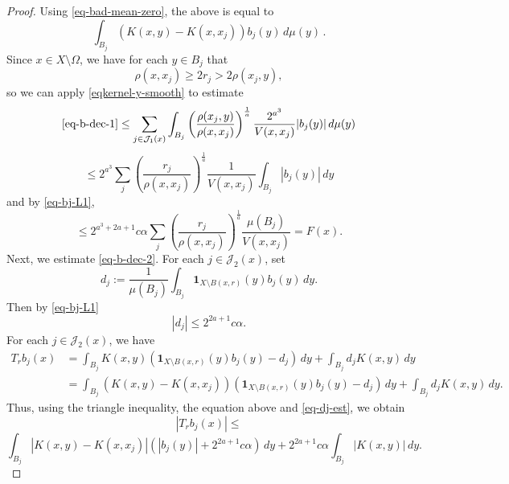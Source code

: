 \begin{proof}
Using \eqref{eq-bad-mean-zero}, the above is equal to
\begin{equation*}
    \int_{B_j} (K(x,y)-K(x,x_j)) b_j(y)\,d\mu(y)\,.
\end{equation*}
Since $x\in X\setminus\Omega$, we have for each $y\in B_j$ that
\begin{equation}
    \label{eq-Om-cj}
    \rho(x,x_j)\ge 2r_j > 2\rho(x_j,y),
\end{equation}
so we can apply \eqref{eqkernel-y-smooth} to estimate
\begin{equation*}
    \eqref{eq-b-dec-1} \le \sum_{j\in \mathcal{J}_1(x)}\int_{B_j}\left(\frac{\rho(x_j,y)}{\rho(x,x_j)}\right)^{\frac{1}{a}}\frac{2^{a^3}}{V(x,x_j)} |b_j(y)|\, d\mu(y)
\end{equation*}
\begin{equation}
    \le 2^{a^3} \sum_{j} \left(\frac{r_j}{\rho(x,x_j)}\right)^{\frac{1}{a}}\frac{1}{V(x,x_j)}\int_{B_j} |b_j(y)|\, dy
\end{equation}
and by \eqref{eq-bj-L1},
\begin{equation}
    \label{eq-J1-diff-est}
    \le 2^{a^3+2a+1} c\alpha \sum_{j} \left(\frac{r_j}{\rho(x,x_j)}\right)^{\frac{1}{a}}\frac{\mu(B_j)}{V(x,x_j)} = F(x).
\end{equation}
Next, we estimate \eqref{eq-b-dec-2}. For each $j\in \mathcal{J}_2(x)$, set
\begin{equation*}
    d_j:=\frac{1}{\mu(B_j)}\int_{B_j} \mathbf{1}_{X\setminus B(x,r)}(y) b_j(y)\, dy.
\end{equation*}
Then by \eqref{eq-bj-L1}
\begin{equation}
    \label{eq-dj-est}
    |d_j|\le 2^{2a+1} c\alpha.
\end{equation}
For each $j\in \mathcal{J}_2(x)$, we have
\begin{align*}
    T_r b_j(x)&=\int_{B_j} K(x,y) (\mathbf{1}_{X\setminus B(x,r)}(y)b_j(y)-d_j)\, dy + \int_{B_j} d_j K(x,y) \, dy \\
    &= \int_{B_j} (K(x,y)-K(x,x_j)) (\mathbf{1}_{X\setminus B(x,r)}(y)b_j(y)-d_j)\, dy + \int_{B_j} d_j K(x,y) \, dy.
\end{align*}
Thus, using the triangle inequality, the equation above and \eqref{eq-dj-est}, we obtain
\begin{equation*}
    |T_r b_j(x)|\le
\end{equation*}
\begin{equation}
    \label{eq-J2-diff-est}
    \int_{B_j} |K(x,y)-K(x,x_j)| \left(|b_j(y)|+2^{2a+1} c\alpha\right)\, dy +2^{2a+1} c\alpha \int_{B_j}  |K(x,y)| \, dy.

\end{equation}
\end{proof}
